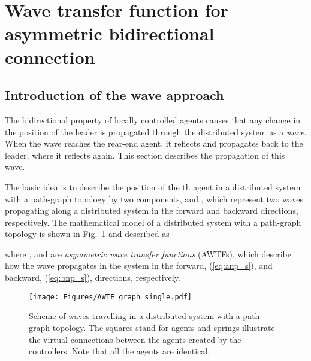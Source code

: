 \documentclass[10pt,twocolumn,twoside]{IEEEtran}
\theoremstyle{definition}
\begin{document}
\section{Wave transfer function for asymmetric bidirectional connection}

\subsection{Introduction of the wave approach}

The bidirectional property of locally controlled agents causes that any change in the position of the leader is propagated through the distributed system as a \emph{wave}. When the wave reaches the rear-end agent, it reflects and propagates back to the leader, where it reflects again. This section describes the propagation of this wave.

The basic idea is to describe the position of the th agent in a distributed system with a path-graph topology by two components,  and , which represent two waves propagating along a distributed system in the forward and backward directions, respectively. The mathematical model of a distributed system with a path-graph topology is shown in Fig.~\ref{fig:AWTF_graph_single} and described as

where ,  and  are \emph{asymmetric wave transfer functions} (AWTFs), which describe how the wave propagates in the system in the forward, (\ref{eq:anp_s}), and backward, (\ref{eq:bnp_s}), directions, respectively.
\begin{figure}[ht]
 \centering
  \texttt{[image: Figures/AWTF\_graph\_single.pdf]}
  \caption{Scheme of waves travelling in a distributed system with a path-graph topology. The squares stand for agents and springs illustrate the virtual connections between the agents created by the controllers. Note that all the agents are identical.}
  \label{fig:AWTF_graph_single}
\end{figure}
\end{document}
